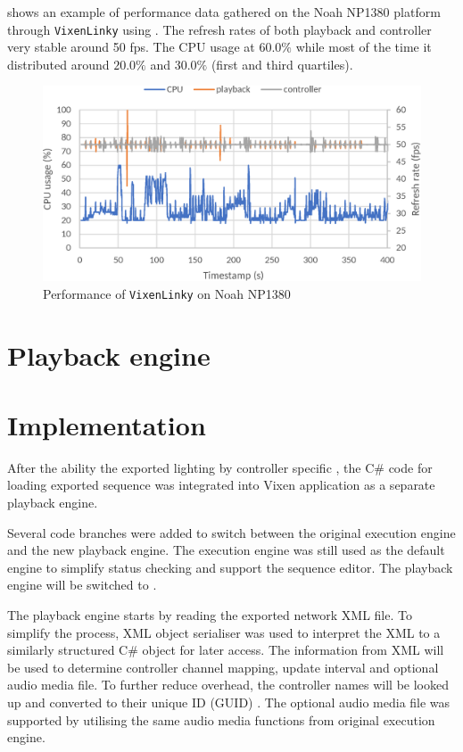  shows an example of performance data gathered on the Noah NP1380 platform through \texttt{VixenLinky} using . The refresh rates of both playback and controller  very stable around  50 fps. The CPU usage  at $60.0 \%$\ca{,} while most of the time it  distributed around $20.0 \%$ and $30.0 \%$ (first and third quartiles).

\begin{figure}[!t]
  \centering
  \includegraphics[width=0.8\columnwidth]{Figs/vixenlinky_noah.eps}
  \caption{\footnotesize Performance of \texttt{VixenLinky} on Noah NP1380}
  \label{fig:vixenlinky_noah}
\end{figure}

\section{Playback engine}

\section{Implementation}

After  the ability  the exported lighting  by controller specific , the C\# code for loading exported sequence  was integrated into Vixen application as a separate playback engine.

Several code branches were added to switch between the original execution engine and the new playback engine. The execution engine was still used as the default engine to simplify status checking and support the sequence editor. The playback engine will be switched to .

The playback engine starts by reading the exported network XML file. To simplify the process,  XML object serialiser was used to interpret  the XML  to a similarly structured C\# object for later access. The information  from XML will be used to determine controller channel mapping, update interval and optional audio media file. To further reduce  overhead, the controller names will be looked up and converted to their unique ID (GUID) . The optional audio media file was supported by utilising the same audio media functions from original execution engine.

